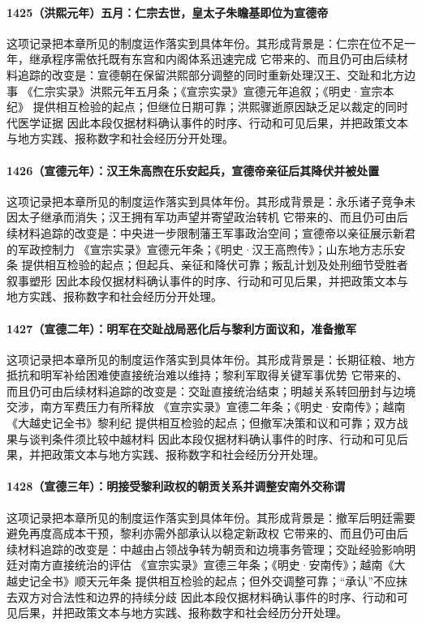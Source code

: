 \paragraph{1425（洪熙元年）五月：仁宗去世，皇太子朱瞻基即位为宣德帝} 这项记录把本章所见的制度运作落实到具体年份。其形成背景是：仁宗在位不足一年，继承程序需依托既有东宫和内阁体系迅速完成 它带来的、而且仍可由后续材料追踪的改变是：宣德朝在保留洪熙部分调整的同时重新处理汉王、交趾和北方边事 《仁宗实录》洪熙元年五月条；《宣宗实录》宣德元年追叙；《明史·宣宗本纪》 提供相互检验的起点；但继位日期可靠；洪熙骤逝原因缺乏足以裁定的同时代医学证据 因此本段仅据材料确认事件的时序、行动和可见后果，并把政策文本与地方实践、报称数字和社会经历分开处理。

\paragraph{1426（宣德元年）：汉王朱高煦在乐安起兵，宣德帝亲征后其降伏并被处置} 这项记录把本章所见的制度运作落实到具体年份。其形成背景是：永乐诸子竞争未因太子继承而消失；汉王拥有军功声望并寄望政治转机 它带来的、而且仍可由后续材料追踪的改变是：中央进一步限制藩王军事政治空间；宣德帝以亲征展示新君的军政控制力 《宣宗实录》宣德元年条；《明史·汉王高煦传》；山东地方志乐安条 提供相互检验的起点；但起兵、亲征和降伏可靠；叛乱计划及处刑细节受胜者叙事塑形 因此本段仅据材料确认事件的时序、行动和可见后果，并把政策文本与地方实践、报称数字和社会经历分开处理。

\paragraph{1427（宣德二年）：明军在交趾战局恶化后与黎利方面议和，准备撤军} 这项记录把本章所见的制度运作落实到具体年份。其形成背景是：长期征粮、地方抵抗和明军补给困难使直接统治难以维持；黎利军取得关键军事优势 它带来的、而且仍可由后续材料追踪的改变是：交趾直接统治结束；明越关系转回册封与边境交涉，南方军费压力有所释放 《宣宗实录》宣德二年条；《明史·安南传》；越南《大越史记全书》黎利纪 提供相互检验的起点；但撤军决策和议和可靠；双方战果与谈判条件须比较中越材料 因此本段仅据材料确认事件的时序、行动和可见后果，并把政策文本与地方实践、报称数字和社会经历分开处理。

\paragraph{1428（宣德三年）：明接受黎利政权的朝贡关系并调整安南外交称谓} 这项记录把本章所见的制度运作落实到具体年份。其形成背景是：撤军后明廷需要避免再度高成本干预，黎利亦需外部承认以稳定新政权 它带来的、而且仍可由后续材料追踪的改变是：中越由占领战争转为朝贡和边境事务管理；交趾经验影响明廷对南方直接统治的评估 《宣宗实录》宣德三年条；《明史·安南传》；越南《大越史记全书》顺天元年条 提供相互检验的起点；但外交调整可靠；“承认”不应抹去双方对合法性和边界的持续分歧 因此本段仅据材料确认事件的时序、行动和可见后果，并把政策文本与地方实践、报称数字和社会经历分开处理。

